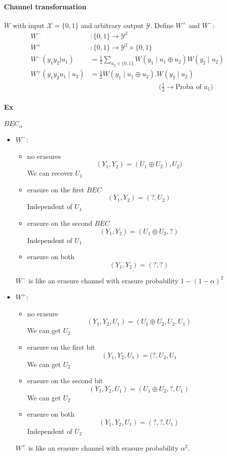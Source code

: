 \documentclass{article}
\begin{document}
\paragraph{Channel transformation}
$W$ with input $\mathcal{X}=\{0,1\}$ and arbitrary output $\mathcal{Y}$. Define $W^+$ and $W^-$:
\begin{align*}
W^- &: \{0,1\}\to \mathcal{Y}^2\\
W^+ &: \{0,1\} \to \mathcal{Y}^2\times \{0,1\}\\
W^-(y_1y_2|u_1)&= \frac{1}{2}\sum_{u_2\in\{0,1\}} W(y_1\;|\;u_1 \oplus u_2)W(y_2\;|\; u_2)\\
W^+(y_1y_2u_1\;|\;u_2) &= \frac{1}{2} W(y_1\;|\;u_1 \oplus u_2). W(y_2\;|\;u_2)\\
& \qquad \qquad \qquad \qquad \qquad \Big( \frac{1}{2} \to \text{Proba of } u_1 \Big)
\end{align*}

\paragraph{Ex} $BEC_\alpha$
\begin{itemize}
\item $W^-$: \begin{itemize}
\item no erasures 
\[(Y_1,Y_2)=(U_1\oplus U_2),U_2) \tag{With proba $(1-\alpha)^2$}\]
We can recover $U_1$
\item erasure on the first $BEC$
\[(Y_1,Y_2)=(?,U_2) \tag{With proba $\alpha(1-\alpha)$}\]
Independent of $U_1$
\item erasure on the second $BEC$
\[(Y_1,Y_2)=(U_1\oplus U_2, ?) \tag{With proba $(1-\alpha)\alpha$}\]
Independent of $U_1$
\item erasure on both
\[(Y_1,Y_2)=(?,?) \tag{With prob $\alpha^2$}\]
\end{itemize}

$W^-$ is like an erasure channel with erasure probability $1-(1-\alpha)^2$

\item $W^+$: 
\begin{itemize}
\item no erasure
\[(Y_1,Y_2,U_1)=(U_1\oplus U_2, U_2,U_1)\]
We can get $U_2$
\item erasure on the first bit
\[(Y_1,Y_2,U_1)=(?,U_2,U_1\]
We can get $U_2$
\item erasure on the second bit
\[(Y_1,Y_2,U_1)=(U_1\oplus U_2,?,U_1)\]
We can get $U_2$
\item erasure on both
\[(Y_1,Y_2,U_1)=(?,?,U_1)\]
Independent of $U_2$
\end{itemize}
$W^+$ is like an erasure channel with erasure probability $\alpha^2$.
\end{itemize}
\end{document}
